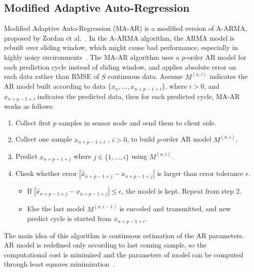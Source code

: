 \subsection{Modified Adaptive Auto-Regression}

Modified Adaptive Auto-Regression (MA-AR) is a modified version of A-ARMA,
proposed by Zordan et al.~\cite{zordan2012compress}. In the A-ARMA algorithm, the
ARMA model is rebuilt over  sliding window, which might cause bad
performance, especially in highly noisy environments~\cite{zordan2012compress}.
The MA-AR algorithm uses a $p$-order AR model for each prediction cycle  instead of
sliding window, and applies  absolute error on each data rather than RMSE of $S$
continuous data. Assume $M^{(n, i)}$ indicates the AR model built according to
data $\{x_n, ..., x_{n+p-1+i} \}$, where $i>0$, and $\hat{x}_{n+p-1+i}$
indicates the predicted data, then for each predicted  cycle, MA-AR works as
follows:

\begin{enumerate}
    \item Collect first $p$ samples in sensor node and send them to client side.
    \item Collect one sample $x_{n+p-1+i}$ , $i > 0$, to build
    $p$-order
    AR model $M^{(n, i)}$.
    \item Predict $x_{n+p-1+j}$ where $j \in \{1, ..., i\}$ using $M^{(n, i)}$.
    \item Check whether error $ |\hat{x}_{n+p-1+j} - x_{n+p-1+j}|$ is larger
    than error tolerance $\epsilon$.
        \begin{itemize}
            \item If $|\hat{x}_{n+p-1+j} - x_{n+p-1+j}| \leqslant \epsilon$, the
            model is kept. Repeat from step 2.
            \item Else the last model $M^{(n, i-1)}$ is encoded and transmitted,
            and new predict cycle is started from $x_{n+p-1+i}$.
        \end{itemize} 
\end{enumerate}
The main idea of this algorithm is continuous estimation of the AR parameters.
AR model is redefined only according to last coming sample, so the computational
cost is minimized and the parameters of model can be computed through least
squares minimization~\cite{zordan2012compress}. 

